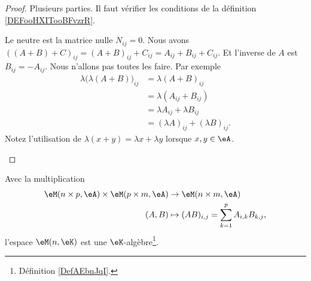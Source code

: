 \begin{proof}
	Plusieurs parties. Il faut vérifier les conditions de la définition \ref{DEFooHXITooBFvzrR}.
	\begin{subproof}
		\spitem[Groupe]
		Le neutre est la matrice nulle \( N_{ij}=0\). Nous avons \( ((A+B)+C)_{ij}=(A+B)_{ij}+C_{ij}=A_{ij}+B_{ij}+C_{ij}\). Et l'inverse de \( A\) est \( B_{ij}=-A_{ij}\).
		Nous n'allons pas toutes les faire. Par exemple
		\begin{subequations}
			\begin{align}
				\lambda\big( \lambda(A+B) \big)_{ij} & =\lambda(A+B)_{ij}                  \\
				                                     & =\lambda(A_{ij}+B_{ij})             \\
				                                     & =\lambda A_{ij}+\lambda B_{ij}      \\
				                                     & =(\lambda A)_{ij}+(\lambda B)_{ij}.
			\end{align}
		\end{subequations}
		Notez l'utilisation de \( \lambda(x+y)=\lambda x+\lambda y\) lorsque \( x,y\in \eA\).
	\end{subproof}
\end{proof}

\begin{lemmaDef}        \label{LEMooMBZTooKdGvON}
	Avec la multiplication
	\begin{equation}
		\begin{aligned}
			\eM(n\times p,\eA)\times \eM(p\times m,\eA) & \to \eM(n\times m,\eA)                         \\
			(A,B)                                       & \mapsto (AB)_{i,j}=\sum_{k=1}^pA_{i,k}B_{k,j},
		\end{aligned}
	\end{equation}
	l'espace \( \eM(n,\eK)\) est une \( \eK\)-algèbre\footnote{Définition \ref{DefAEbnJqI}.}.
\end{lemmaDef}

